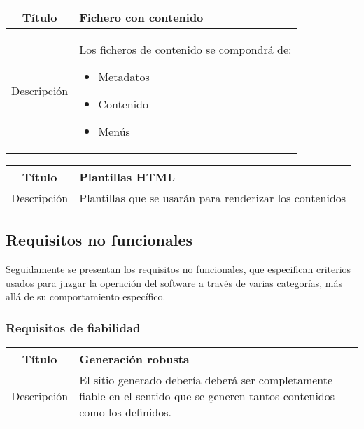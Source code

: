 \begin{center}

    \begin{tabularx}{\textwidth}{|c|X|}
        \hline
        Título & Fichero con contenido\\

        \hline

        Descripción & Los ficheros de contenido se compondrá de:
        \begin{itemize}
            \item Metadatos
            \item Contenido
            \item Menús
        \end{itemize}\\

        \hline
    \end{tabularx}
\end{center}

\begin{center}

    \begin{tabularx}{\textwidth}{|c|X|}
        \hline
        Título & Plantillas HTML\\

        \hline

        Descripción & Plantillas que se usarán para renderizar los contenidos\\

        \hline
    \end{tabularx}
\end{center}

\subsection{Requisitos no funcionales}

Seguidamente se presentan los requisitos no funcionales, que especifican criterios
usados para juzgar la operación del software a través de varias categorías, más
allá de su comportamiento específico.

\subsubsection{Requisitos de fiabilidad}

\begin{center}

    \begin{tabularx}{\textwidth}{|c|X|}
        \hline
        Título & Generación robusta\\

        \hline

        Descripción & El sitio generado debería deberá ser completamente fiable
        en el sentido que se generen tantos contenidos como los definidos.\\

        \hline
    \end{tabularx}
\end{center}

